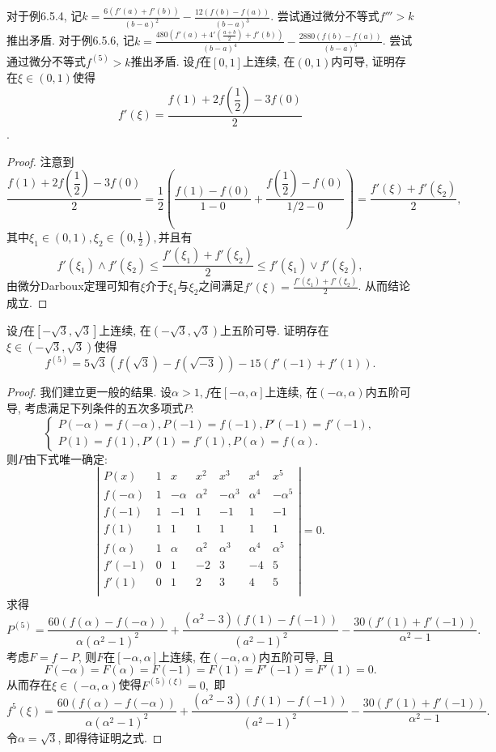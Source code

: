 \begin{quiza}
\begin{solution}
\end{solution}
\woe 对于例6.5.4, 记\(k=\frac{6\left(f'(a)+f'(b)\right)}{(b-a)^2}-\frac{12(f(b)-f(a))}{(b-a)^3}\). 尝试通过微分不等式\(f'''>k\)推出矛盾.
\woe 对于例6.5.6, 记\(k=\frac{480\left(f'(a)+4'\left(\frac{a+b}{2}\right)+f'(b)\right)}{(b-a)^4}-\frac{2880\left(f(b)-f(a)\right)}{(b-a)^5}\). 尝试通过微分不等式\(f^{(5)}>k\)推出矛盾.
\woe 设\(f\)在\([0,1]\)上连续, 在\((0,1)\)内可导, 证明存在\(\xi\in(0,1)\)使得\[f'(\xi)=\frac{f(1)+2f\left(\dfrac{1}{2}\right)-3f(0)}{2}\].
\begin{proof}
注意到\[\frac{f(1)+2f\left(\dfrac{1}{2}\right)-3f(0)}{2}=\frac{1}{2}\left(\frac{f(1)-f(0)}{1-0}+\frac{f\left(\dfrac{1}{2}\right)-f(0)}{1/2-0}\right)=\frac{f'(\xi)+f'(\xi_2)}{2},\]其中\(\xi_1\in(0,1),\xi_2\in\left(0,\frac{1}{2}\right),\)并且有\[f'(\xi_1)\wedge f'(\xi_2)\leqslant\frac{f'(\xi_1)+f'(\xi_2)}{2}\leqslant f'(\xi_1)\vee f'(\xi_2),\]由微分Darboux定理可知有\(\xi\)介于\(\xi_1\)与\(\xi_2\)之间满足\(f'(\xi)=\frac{f'(\xi_1)+f'(\xi_2)}{2}\). 从而结论成立.
\end{proof}
\woe 设\(f\)在\([-\sqrt{3},\sqrt{3}]\)上连续, 在\((-\sqrt{3},\sqrt{3})\)上五阶可导. 证明存在\(\xi \in (-\sqrt{3},\sqrt{3})\)使得\[f^{(5)}=5\sqrt{3}\left(f(\sqrt{3})-f(\sqrt{-3})\right)-15\left(f'(-1)+f'(1)\right).\]
\begin{proof}
我们建立更一般的结果. 设\(\alpha>1,f\)在\([-\alpha,\alpha]\)上连续, 在\(\left(-\alpha,\alpha\right)\)内五阶可导, 考虑满足下列条件的五次多项式\(P\):\[\begin{cases}
P(-\alpha)=f(-\alpha),P(-1)=f(-1),P'(-1)=f'(-1),\\
P(1)=f(1),P'(1)=f'(1),P(\alpha)=f(\alpha).
\end{cases}\]则\(P\)由下式唯一确定:\[\left|\begin{matrix}
P(x)&1&x&x^2&x^3&x^4&x^5\\
f(-\alpha)&1&-\alpha&\alpha^2&-\alpha^3&\alpha^4&-\alpha^5\\
f(-1)&1&-1&1&-1&1&-1\\
f(1)&1&1&1&1&1&1\\
f(\alpha)&1&\alpha&\alpha^2&\alpha^3&\alpha^4&\alpha^5\\
f'(-1)&0&1&-2&3&-4&5\\
f'(1)&0&1&2&3&4&5\\
\end{matrix}\right|=0.\]求得\[P^{(5)}=\frac{60\left(f(\alpha)-f(-\alpha)\right)}{\alpha(\alpha^2-1)^2}+\frac{(\alpha^2-3)\left(f(1)-f(-1)\right)}{\left(a^2-1\right)^2}-\frac{30\left(f'(1)+f'(-1)\right)}{\alpha^2-1}.\]考虑\(F=f-P\), 则\(F\)在\([-\alpha,\alpha]\)上连续, 在\((-\alpha,\alpha)\)内五阶可导, 且\[F(-\alpha)=F(\alpha)=F(-1)=F(1)=F'(-1)=F'(1)=0.\]从而存在\(\xi\in(-\alpha,\alpha)\)使得\(F^{(5)(\xi)}=0,\) 即\[f^{5}(\xi)=\frac{60\left(f(\alpha)-f(-\alpha)\right)}{\alpha(\alpha^2-1)^2}+\frac{(\alpha^2-3)\left(f(1)-f(-1)\right)}{\left(a^2-1\right)^2}-\frac{30\left(f'(1)+f'(-1)\right)}{\alpha^2-1}.\]令\(\alpha=\sqrt{3}\), 即得待证明之式.

\end{proof}
\end{quiza}
